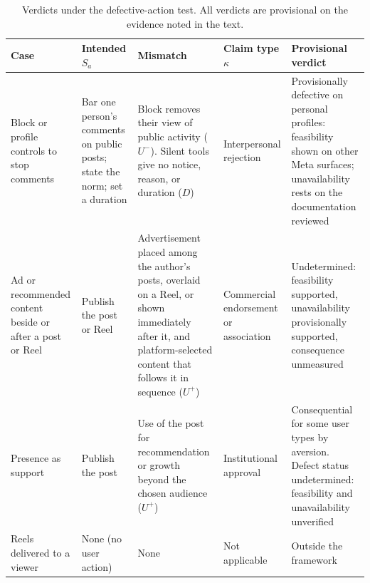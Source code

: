 \begin{table}[h]
\centering
\small
\renewcommand{\arraystretch}{1.3}
\begin{tabular}{@{}>{\raggedright\arraybackslash}p{2.3cm}>{\raggedright\arraybackslash}p{2.6cm}>{\raggedright\arraybackslash}p{3.6cm}>{\raggedright\arraybackslash}p{2.0cm}>{\raggedright\arraybackslash}p{3.3cm}@{}}
\toprule
Case & Intended $S_a$ & Mismatch & Claim type $\kappa$ & Provisional verdict \\
\midrule
Block or profile controls to stop comments
  & Bar one person's comments on public posts; state the norm; set a duration
  & Block removes their view of public activity ($U^{-}$). Silent tools give no notice, reason, or duration ($D$)
  & Interpersonal rejection
  & Provisionally defective on personal profiles: feasibility shown on other Meta surfaces; unavailability rests on the documentation reviewed \\
Ad or recommended content beside or after a post or Reel
  & Publish the post or Reel
  & Advertisement placed among the author's posts, overlaid on a Reel, or shown immediately after it, and platform-selected content that follows it in sequence ($U^{+}$)
  & Commercial endorsement or association
  & Undetermined: feasibility supported, unavailability provisionally supported, consequence unmeasured \\
Presence as support
  & Publish the post
  & Use of the post for recommendation or growth beyond the chosen audience ($U^{+}$)
  & Institutional approval
  & Consequential for some user types by aversion. Defect status undetermined: feasibility and unavailability unverified \\
Reels delivered to a viewer
  & None (no user action)
  & None
  & Not applicable
  & Outside the framework \\
\bottomrule
\end{tabular}
\caption{Verdicts under the defective-action test. All verdicts are provisional on the evidence noted in the text.}
\end{table}

